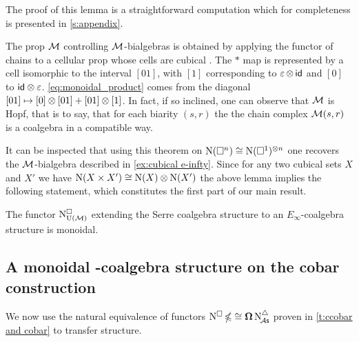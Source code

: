 The proof of this lemma is a straightforward computation which for completeness is presented in \cref{s:appendix}.

\begin{remark}
	The prop $\mathcal{M}$ controlling $\mathcal{M}$-bialgebras is obtained by applying the functor of chains to a cellular prop whose cells are cubical \cite{medina2021prop2}.
	The $\ast$ map is represented by a cell isomorphic to the interval $[01]$, with $[1]$ corresponding to $\operatorname{\varepsilon} \otimes \, \mathsf{id}$ and $[0]$ to $\mathsf{id} \otimes \operatorname{\varepsilon}$.
	\cref{eq:monoidal_product} comes from the diagonal $[01] \mapsto [0] \otimes [01] + [01] \otimes [1]$.
	In fact, if so inclined, one can observe that $\mathcal{M}$ is Hopf, that is to say, that for each biarity $(s,r)$ the the chain complex $\mathcal{M}(s,r)$ is a coalgebra in a compatible way.
\end{remark}

It can be inspected that using this theorem on $\operatorname{N}(\square^n) \cong \operatorname{N}(\square^1)^{\otimes n}$ one recovers the $\mathcal{M}$-bialgebra described in \cref{ex:cubical e-infty}.
Since for any two cubical sets $X$ and $X'$ we have $\operatorname{N}(X \times X') \cong \operatorname{N}(X) \otimes \operatorname{N}(X')$ the above lemma implies the following statement, which constitutes the first part of our main result.

\begin{theorem}\label{t:cubical e-infty chains are monoidal}
	The functor $\operatorname{N^{\square}_{{\operatorname{U}(\mathcal{M})}}}$ extending the Serre coalgebra structure to an $E_\infty$-coalgebra structure is monoidal.
\end{theorem}

\subsection{A monoidal \pdfEinfty-coalgebra structure on the cobar construction}\label{ss:e-infty on cobar}


We now use the natural equivalence of functors $\operatorname{N^{\square}} \operatorname{\mathbb{\Omega}} \cong \operatorname{\mathbf{\Omega}} \operatorname{N^{\triangle}_{\!{\mathcal{A}\mathsf{s}}}}$ proven in \cref{t:ccobar and cobar} to transfer structure.

